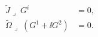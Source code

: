 \begin{equation}
\begin{aligned}
   \tilde{J} \lrcorner\; G^i &= 0 , \\
   \tilde{\Omega}\lrcorner\; (G^1+\ii G^2) &= 0 .
\end{aligned}
\end{equation}

